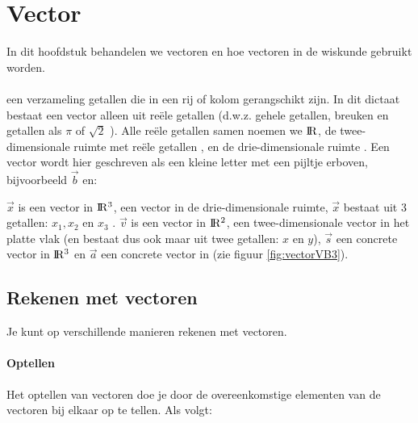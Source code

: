 \chapter{Vector}
\label{chap:vectoren}
In dit hoofdstuk behandelen we vectoren en hoe vectoren in de wiskunde gebruikt worden.\\ \\

 {een verzameling getallen die in een rij of kolom gerangschikt zijn.}
In dit dictaat bestaat een vector alleen uit reële getallen (d.w.z. gehele getallen, breuken en getallen als $  \pi $ of $ \sqrt{2} $ ). Alle reële getallen samen noemen we $\rm I\!R$, de twee-dimensionale ruimte met reële getallen \RT, en de drie-dimensionale ruimte \RD.
Een vector wordt hier geschreven als een kleine letter met een pijltje erboven, bijvoorbeeld $\vec{b}$ en: \\


$\vec{x}$ is een  vector in ${\rm I\!R^{3}}$,  een  vector in de drie-dimensionale ruimte, $ \vec{x} $  bestaat uit 3 getallen: $  x_{1},  x_{2} $  en  $ x_{3}$ .  $\vec{v}$  is een  vector in ${\rm I\!R^{2}}$, een twee-dimensionale vector in het platte vlak (en bestaat dus ook maar uit twee getallen: $x$ en $y$), $\vec{s}$ een concrete vector in  ${\rm I\!R^{3}}$ en $ \vec{a}  $ een concrete vector in \RT (zie figuur  \ref{fig:vectorVB3}).



\section{Rekenen met vectoren}
Je kunt op verschillende manieren rekenen met vectoren.
\subsubsection{Optellen}
Het optellen van vectoren doe je door de overeenkomstige elementen van de vectoren bij elkaar op te tellen. Als volgt:\\

